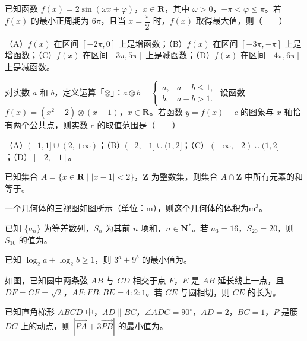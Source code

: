 \begin{question}
已知函数 $f(x)=2\sin(\omega x+\varphi)$，$x\in\mathbf R$，其中 $\omega>0$，$-\pi<\varphi\leqslant\pi$。若 $f(x)$ 的最小正周期为 $6\pi$，且当 $x=\dfrac\pi2$ 时，$f(x)$ 取得最大值，则\mbox{（　　）}

（A）$f(x)$ 在区间 $[-2\pi,0]$ 上是增函数；（B）$f(x)$ 在区间 $[-3\pi,-\pi]$ 上是增函数；（C）$f(x)$ 在区间 $[3\pi,5\pi]$ 上是减函数；（D）$f(x)$ 在区间 $[4\pi,6\pi]$ 上是减函数。
\end{question}
\begin{question}
对实数 $a$ 和 $b$，定义运算「$\otimes$」：$a\otimes b=\begin{cases}a,&a-b\leqslant1,\\ b,&a-b>1.\end{cases}$ 设函数 $f(x)=(x^2-2)\otimes(x-1)$，$x\in\mathbf R$。若函数 $y=f(x)-c$ 的图象与 $x$ 轴恰有两个公共点，则实数 $c$ 的取值范围是\mbox{（　　）}

（A）$(-1,1]\cup(2,+\infty)$；（B）$(-2,-1]\cup(1,2]$；（C）$(-\infty,-2)\cup(1,2]$；（D）$[-2,-1]$。
\end{question}

\begin{question}
已知集合 $A=\{x\in\mathbf R\mid |x-1|<2\}$，$\mathbf Z$ 为整数集，则集合 $A\cap\mathbf Z$ 中所有元素的和等于\gkblank{}。

\Needspace{0.4\textheight}
\end{question}
\begin{question}
一个几何体的三视图如图所示（单位：$\mathrm m$），则这个几何体的体积为\gkblank{}$\mathrm m^3$。
\nopagebreak[4]
\begin{center}\end{center}
\nopagebreak[4]
\end{question}
\begin{question}
已知 $\{a_n\}$ 为等差数列，$S_n$ 为其前 $n$ 项和，$n\in\mathbf N^*$。若 $a_3=16$，$S_{20}=20$，则 $S_{10}$ 的值为\gkblank{}。

\end{question}
\begin{question}
已知 $\log_2a+\log_2b\geqslant1$，则 $3^a+9^b$ 的最小值为\gkblank{}。

\Needspace{0.4\textheight}
\end{question}
\begin{question}
如图，已知圆中两条弦 $AB$ 与 $CD$ 相交于点 $F$，$E$ 是 $AB$ 延长线上一点，且 $DF=CF=\sqrt2$，$AF:FB:BE=4:2:1$。若 $CE$ 与圆相切，则 $CE$ 的长为\gkblank{}。
\nopagebreak[4]
\begin{center}\end{center}
\nopagebreak[4]
\end{question}
\begin{question}
已知直角梯形 $ABCD$ 中，$AD\parallel BC$，$\angle ADC=90^\circ$，$AD=2$，$BC=1$，$P$ 是腰 $DC$ 上的动点，则 $|\overrightarrow{PA}+3\overrightarrow{PB}|$ 的最小值为\gkblank{}。

\end{question}

